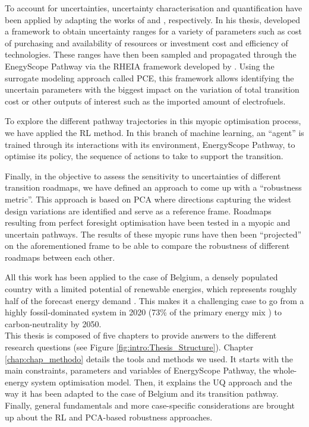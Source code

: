 To account for uncertainties, uncertainty characterisation and quantification have been applied by adapting the works of \citet{Moret2017PhDThesis} and \citet{coppittersthesis}, respectively. In his thesis, \citet{Moret2017PhDThesis} developed a framework to obtain uncertainty ranges for a variety of parameters such as cost of purchasing and availability of resources or investment cost and efficiency of technologies. These ranges have then been sampled and propagated through the EnegyScope Pathway via the RHEIA framework developed by \citet{coppittersthesis}. Using the surrogate modeling approach called \gls{PCE}, this framework allows identifying the uncertain parameters with the biggest impact on the variation of total transition cost or other outputs of interest such as the imported amount of electrofuels. 

To explore the different pathway trajectories in this myopic optimisation process, we have applied the \acrfull{RL} method. In this branch of machine learning, an ``agent'' is trained through its interactions with its environment, EnergyScope Pathway, to optimise its policy, \ie the sequence of actions to take to support the transition. 

Finally, in the objective to assess the sensitivity to uncertainties of different transition roadmaps, we have defined an approach to come up with a ``robustness metric''. This approach is based on \gls{PCA} where directions capturing the widest design variations are identified and serve as a reference frame. Roadmaps resulting from perfect foresight optimisation have been tested in a myopic and uncertain pathways. The results of these myopic runs have then been ``projected'' on the aforementioned frame to be able to compare the robustness of different roadmaps between each other.

All this work has been applied to the case of Belgium, a densely populated country with a limited potential of renewable energies, which represents roughly half of the forecast energy demand \cite{Limpens2020}. This makes it a challenging case to go from a highly fossil-dominated system in 2020 (73\% of the primary energy mix \cite{spf_economy_2022}) to carbon-neutrality by 2050.\\

\noindent
This thesis is composed of five chapters to provide answers to the different research questions (see Figure \ref{fig:intro:Thesis_Structure}). Chapter \ref{chap:chap_methodo} details the tools and methods we used. It starts with the main constraints, parameters and variables of EnergyScope Pathway, the whole-energy system optimisation model. Then, it explains the \acrfull{UQ} approach and the way it has been adapted to the case of Belgium and its transition pathway. Finally, general fundamentals and more case-specific considerations are brought up about the \gls{RL} and \gls{PCA}-based robustness approaches.

